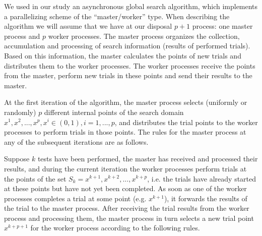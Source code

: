 \documentclass[runningheads]{llncs}
\begin{document}
We used in our study an asynchronous global search algorithm, which implements a parallelizing scheme of the ``master/worker'' type. When describing the algorithm we will assume that we have at our disposal $p+1$ process: one master process and $p$ worker processes. The master process organizes the collection, accumulation and processing of search information (results of performed trials). Based on this information, the master calculates the points of new trials and distributes them to the worker processes. The worker processes receive the points from the master, perform new trials in these points and send their results to the master.

At the first iteration of the algorithm, the master process selects (uniformly or randomly) $p$ different internal points of the search domain ${x^1, x^2, ..., x^p}, x^i \in (0,1), i=1, ..., p$, and distributes the trial points to the worker processes to perform trials in those points. The rules for the master process at any of the subsequent iterations are as follows. 

Suppose $k$ tests have been performed, the master has received and processed their results, and during the current iteration the worker processes perform trials at the points of the set $S_k={x^{k+1}, x^{k+2},..., x^{k+p}}$, i.e. the trials have already started at these points but have not yet been completed. As soon as one of the worker processes completes a trial at some point (e.g. $x^{k+1}$), it forwards the results of the trial to the master process. After receiving the trial results from the worker process and processing them, the master process in turn selects a new trial point $x^{k+p+1}$ for the worker process according to the following rules.
\end{document}
